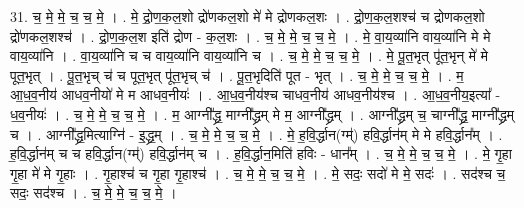 \documentclass[17pt]{extarticle}
\begin{document}
31. च॒ मे॒ मे॒ च॒ च॒ मे॒ । . मे॒ द्रो॒ण॒क॒ल॒शो द्रो॑णकल॒शो मे॑ मे द्रोणकल॒शः । . द्रो॒ण॒क॒ल॒शश्च॑ च द्रोणकल॒शो द्रो॑णकल॒शश्च॑ । . द्रो॒ण॒क॒ल॒श इति॑ द्रोण - क॒ल॒शः । . च॒ मे॒ मे॒ च॒ च॒ मे॒ । . मे॒ वा॒य॒व्या॑नि वाय॒व्या॑नि मे मे वाय॒व्या॑नि । . वा॒य॒व्या॑नि च च वाय॒व्या॑नि वाय॒व्या॑नि च । . च॒ मे॒ मे॒ च॒ च॒ मे॒ । . मे॒ पू॒त॒भृत् पू॑त॒भृन् मे॑ मे पूत॒भृत् । . पू॒त॒भृच् च॑ च पूत॒भृत् पू॑त॒भृच् च॑ । . पू॒त॒भृदिति॑ पूत - भृत् । . च॒ मे॒ मे॒ च॒ च॒ मे॒ । . म॒ आ॒ध॒व॒नीय॑ आधव॒नीयो॑ मे म आधव॒नीयः॑ । . आ॒ध॒व॒नीय॑श्च चाधव॒नीय॑ आधव॒नीय॑श्च । . आ॒ध॒व॒नीय॒इत्या᳚ - ध॒व॒नीयः॑ । . च॒ मे॒ मे॒ च॒ च॒ मे॒ । . म॒ आग्नी᳚द्ध्र॒ माग्नी᳚द्ध्रम् मे म॒ आग्नी᳚द्ध्रम् । . आग्नी᳚द्ध्रम् च॒ चाग्नी᳚द्ध्र॒ माग्नी᳚द्ध्रम् च । . आग्नी᳚द्ध्र॒मित्याग्नि॑ - इ॒द्ध्र॒म् । . च॒ मे॒ मे॒ च॒ च॒ मे॒ । . मे॒ ह॒वि॒र्द्धान(ग्म्॑) हवि॒र्द्धान॑म् मे मे हवि॒र्द्धान᳚म् । . ह॒वि॒र्द्धान॑म् च च हवि॒र्द्धान(ग्म्॑) हवि॒र्द्धान॑म् च । . ह॒वि॒र्द्धान॒मिति॑ हविः - धान᳚म् । . च॒ मे॒ मे॒ च॒ च॒ मे॒ । . मे॒ गृ॒हा गृ॒हा मे॑ मे गृ॒हाः । . गृ॒हाश्च॑ च गृ॒हा गृ॒हाश्च॑ । . च॒ मे॒ मे॒ च॒ च॒ मे॒ । . मे॒ सदः॒ सदो॑ मे मे॒ सदः॑ । . सद॑श्च च॒ सदः॒ सद॑श्च । . च॒ मे॒ मे॒ च॒ च॒ मे॒ । \newline
\end{document}
